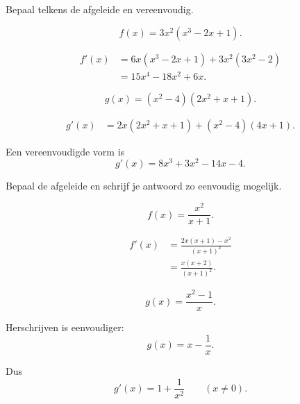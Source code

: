 \documentclass{ximera}
\begin{document}
\begin{oefening}{\oefB}

Bepaal telkens de afgeleide en vereenvoudig.

\begin{question}
\[
f(x)=3x^2(x^3-2x+1).
\]

\begin{oplossing}
\[
\begin{aligned}
f'(x)
&=6x(x^3-2x+1)
 +3x^2(3x^2-2)\\
&=15x^4-18x^2+6x.
\end{aligned}
\]
\end{oplossing}
\end{question}


\begin{question}
\[
g(x)=(x^2-4)(2x^2+x+1).
\]

\begin{oplossing}
\[
\begin{aligned}
g'(x)
&=2x(2x^2+x+1)
 +(x^2-4)(4x+1).
\end{aligned}
\]

Een vereenvoudigde vorm is
\[
\boxed{
g'(x)=8x^3+3x^2-14x-4
}.
\]
\end{oplossing}
\end{question}

\end{oefening}



\begin{oefening}{\oefB\ESS}

Bepaal de afgeleide en schrijf je antwoord zo eenvoudig mogelijk.

\begin{question}
\[
f(x)=\frac{x^2}{x+1}.
\]

\begin{oplossing}
\[
\begin{aligned}
f'(x)
&=\frac{2x(x+1)-x^2}{(x+1)^2}\\
&=\boxed{\frac{x(x+2)}{(x+1)^2}}.
\end{aligned}
\]
\end{oplossing}
\end{question}


\begin{question}
\[
g(x)=\frac{x^2-1}{x}.
\]

\begin{oplossing}
Herschrijven is eenvoudiger:
\[
g(x)=x-\frac1x.
\]

Dus
\[
\boxed{
g'(x)=1+\frac1{x^2}
}
\qquad(x\neq0).
\]
\end{oplossing}
\end{question}

\end{oefening}
\end{document}
